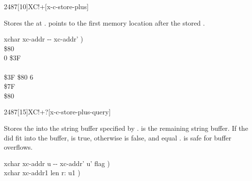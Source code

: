 \begin{worddef}{2487}[10]{XC!+}[x-c-store-plus]
\item {}

	Stores the  at .  
	points to the first memory location after the stored .

	\begin{implement}
	\word{:}   xchar xc-addr -{}- xc-addr' ) \\
	\tab {} \$80          \\
	\tab {} 0  \$3F \\
	\tab {}    \\
	\tab[2]    \$3F  \$80   6   \\
	\tab {} \$7F     \\
	\tab {}  \$80         \\
	\word{;}
	\end{implement}
\end{worddef}


\begin{worddef}[XC!+q]{2487}[15]{XC!+?}[x-c-store-plus-query]
\item {}

	Stores the  into the string buffer specified by
	.   is the remaining string
	buffer.  If the  did fit into the buffer, \param{flag}
	is true, otherwise  is false, and \param{xc-addr_2 u_2}
	equal .   is safe for buffer overflows.

	\begin{implement}
	\word{:}   xchar xc-addr u -{}- xc-addr' u' flag ) \\
	\tab {}        xchar xc-addr1 len r: u1 ) \\
	\tab[2]   \\
	\tab[2]     \\
	\tab {} \\
	\tab[2]      \word{-}  \\
	\tab {} \word{;}
	\end{implement}

	\begin{testing}
	\end{testing}
\end{worddef}


